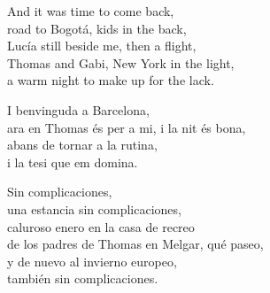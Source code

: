 \begin{lyrics}
And it was time to come back,\\
road to Bogotá, kids in the back,\\
Lucía still beside me, then a flight,\\
Thomas and Gabi, New York in the light,\\
a warm night to make up for the lack.

I benvinguda a Barcelona,\\
ara en Thomas és per a mi, i la nit és bona,\\
abans de tornar a la rutina,\\
i la tesi que em domina.

Sin complicaciones,\\
una estancia sin complicaciones,\\
caluroso enero en la casa de recreo\\
de los padres de Thomas en Melgar, qué paseo,\\
y de nuevo al invierno europeo,\\
también sin complicaciones.
\end{lyrics}

